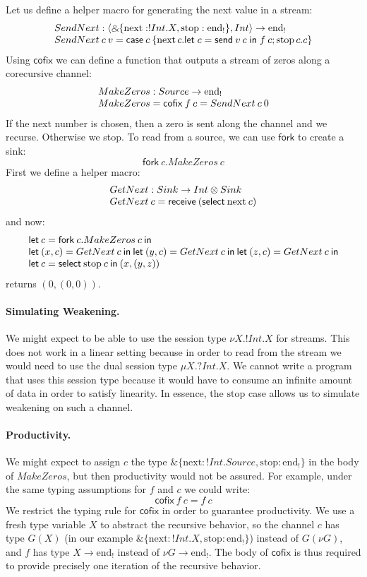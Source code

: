\documentclass[orivec,envcountsame]{llncs}
\makeatletter
\newcommand{\with}{\mathbin\binampersand}
\newcommand{\uto}{\ensuremath{\rightarrow}}
\newcommand{\outterm}{\mathrm{end}_!}
\newcommand{\mkwd}[1]{\mathsf{#1}}
\newcommand{\clabel}[1]{\mathrm{#1}}
\newcommand{\gvsend}[2]{\mkwd{send}\:#1\:#2}
\newcommand{\gvreceive}[1]{\mkwd{receive}\:#1}
\newcommand{\gvlet}[3]{\mkwd{let}\;#1 = #2\;\mkwd{in}\;#3}
\newcommand{\gvselect}[2]{\mkwd{select}\:#1\:#2}
\newcommand{\gvcase}[2]{\mkwd{case}\:#1\:\{#2\}}
\newcommand{\gvfork}[2]{\mkwd{fork}\:#1.#2}
\newcommand{\lrkwd}{\mkwd{cofix}}
\newcommand{\key}{\mkwd}
\newcommand{\cofix}{\lrkwd}
\newcommand{\ba}{\begin{array}}
\newcommand{\ea}{\end{array}}
\newcommand{\bl}{\ba[t]{@{}l@{}}}
\newcommand{\el}{\ea}
\makeatother
\begin{document}
Let us define a helper macro for generating the next value in a stream:
\[
\bl
SendNext : \langle \with \{\clabel{next}: !Int.X, \clabel{stop}: \outterm \}, Int \rangle \uto \outterm \\
SendNext\:c\:v = \gvcase{c}{\clabel{next}\,c.\gvlet{c}{\gvsend{v}{c}}{f\:c};
                            \clabel{stop}\,c.c}
\el
\]
%
Using $\cofix$ we can define a function that outputs a stream of zeros along a corecursive
channel:
\[
  \bl
  MakeZeros : Source \uto \outterm \\
  MakeZeros = \cofix\:f\:c = SendNext\:c\:0
  \el
\]
If the next number is chosen, then a zero is sent along the channel and we recurse. Otherwise we
stop.
%
To read from a source, we can use $\key{fork}$ to create a sink:
\[
\gvfork{c}{MakeZeros\:c}
\]
%
First we define a helper macro:
\[
\bl
GetNext : Sink \uto Int \otimes Sink \\
GetNext\:c = \gvreceive{(\gvselect{\clabel{next}}{c})} \\
\el
\]
and now:
\[
\bl
\key{let}\:c = \gvfork{c}{MakeZeros\:c}\:\key{in} \\
\key{let}\:(x, c) = GetNext\:c\:\key{in}\:
\key{let}\:(y, c) = GetNext\:c\:\key{in}\:
\key{let}\:(z, c) = GetNext\:c\:\key{in} \\
\key{let}\:c = \gvselect{\clabel{stop}}{c}\:\key{in}\:(x, (y, z)) \\
\el
\]
returns $(0, (0, 0))$.

\paragraph{Simulating Weakening.}
We might expect to be able to use the session type $\nu X.!Int.X$ for streams. This does not work in
a linear setting because in order to read from the stream we would need to use the dual session type
$\mu X.?Int.X$. We cannot write a program that uses this session type because it would have to
consume an infinite amount of data in order to satisfy linearity. In essence, the $\clabel{stop}$
case allows us to simulate weakening on such a channel.

\paragraph{Productivity.}
We might expect to assign $c$ the type $\with \{\clabel{next}: !Int.Source, \clabel{stop}: \outterm
\}$ in the body of $MakeZeros$, but then productivity would not be assured. For example, under the
same typing assumptions for $f$ and $c$ we could write:
\[
\cofix\:f\:c = f\:c
\]
%
We restrict the typing rule for $\cofix$ in order to guarantee productivity. We use a fresh type
variable $X$ to abstract the recursive behavior, so the channel $c$ has type $G(X)$ (in our example
$\with \{\clabel{next}: !Int.X, \clabel{stop}: \outterm \}$) instead of $G(\nu G)$, and $f$ has type
$X \uto \outterm$ instead of $\nu G \uto \outterm$. The body of $\cofix$ is thus required to provide
precisely one iteration of the recursive behavior.
\end{document}
